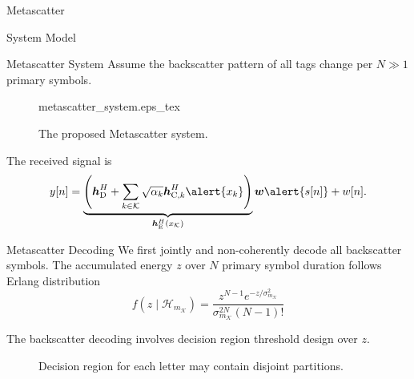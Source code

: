 \documentclass[9pt]{beamer}
\begin{document}
\begin{section}{Metascatter}
\begin{subsection}{System Model}
			\begin{frame}{Metascatter System}
				Assume the backscatter pattern of all tags change per $N \gg 1$ primary symbols.

				\vspace{1em}
				\begin{figure}[!t]
					\centering
					\def\svgwidth{0.7\columnwidth}
					{metascatter_system.eps_tex}
					\caption{The proposed Metascatter system.}
					\label{fi:metascatter_system}
				\end{figure}
				The received signal is
				\begin{equation}
					y[n] = \underbrace{\left(\boldsymbol{h}_{\mathrm{D}}^H + \sum_{k \in \mathcal{K}} \sqrt{\alpha_k} \boldsymbol{h}_{\mathrm{C},k}^H \alert{x_k}\right)}_{\boldsymbol{h}_{\mathrm{E}}^H(x_{\mathcal{K}})} \boldsymbol{w} \alert{s[n]} + w[n].
					\label{eq:received_signal}
				\end{equation}
			\end{frame}

			\begin{frame}{Metascatter Decoding}
				We first \alert{jointly} and \alert{non-coherently} decode all backscatter symbols. The accumulated energy $z$ over $N$ primary symbol duration follows Erlang distribution
				\begin{equation}
					f(z \mid \mathcal{H}_{m_{\mathcal{K}}}) = \frac{z^{N-1} e^{-z/\sigma_{m_{\mathcal{K}}}^2}}{\sigma_{m_{\mathcal{K}}}^{2N} (N-1)!}
					\label{eq:energy_distribution}
				\end{equation}

				\vspace{1em}
				The backscatter decoding involves \alert{decision region threshold} design over $z$.
				\begin{figure}
					\caption{Decision region for each letter may contain disjoint partitions.}
				\end{figure}
			\end{frame}


\end{subsection}
\end{section}
\end{document}
